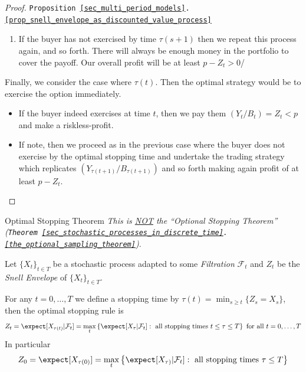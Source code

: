 \documentclass[11pt,a4paper]{article}
\begin{document}
\begin{proof}{\texttt{Proposition \ref{sec_multi_period_models}.\ref{prop_snell_envelope_as_discounted_value_process}}}
\begin{enumerate}
\begin{itemize}
        \item We repeat the process, undertaking the trading strategy that replicates $Y_{\tau(s+1)}/B_{\tau(s+1)}$.
        \item The value of the portfolio to be built up is equal to
        \[ \expect_\Q[Y_{\tau(s+1)}/B_{\tau(s+1)}|\mathcal{F}_s]\leq\expect_\Q[Y_{\tau(s)}/B_{\tau(s)}|\mathcal{F}_s]=Z_s \]
        Therefore the change of the portfolio will only pay us some money which we put in the bank account.
        \item As before, if the option buyer exercises at some time $u\leq\tau(s+1)$ then the value of the portfolio will be enough to cover the payoff $Y_u$.
      \end{itemize}
      \item If the buyer has not exercised by time $\tau(s+1)$ then we repeat this process again, and so forth. There will always be enough money in the portfolio to cover the payoff. Our overall profit will be at least $p-Z_t>0$/
    \end{enumerate}
    Finally, we consider the case where $\tau(t)$. Then the optimal strategy would be to exercise the option immediately.
    \begin{itemize}
      \item If the buyer indeed exercises at time $t$, then we pay them $(Y_t/B_t)=Z_t<p$ and make a riskless-profit.
      \item If note, then we proceed as in the previous case where the buyer does not exercise by the optimal stopping time and undertake the trading strategy which replicates $(Y_{\tau(t+1)}/B_{\tau(t+1)})$ and so forth making again profit of at least $p-Z_t$.
    \end{itemize}
    \proved
  \end{proof}

  \begin{theorem}{Optimal Stopping Theorem}\label{the_optimal_stopping_theorem}
    \textit{This is \underline{NOT} the ``Optional Stopping Theorem'' (\texttt{Theorem \ref{sec_stochastic_processes_in_discrete_time}.\ref{the_optional_sampling_theorem}})}.
    \par Let $\{X_t\}_{t\in T}$ be a stochastic process adapted to some \textit{Filtration} $\mathcal{F}_t$ and $Z_t$ be the \textit{Snell Envelope} of $\{X_t\}_{t\in T}$.
    \par For any $t=0,\dots,T$ we define a stopping time by $\tau(t)=\min_{s\geq t}\{Z_s=X_s\}$, then the optimal stopping rule is
    \begin{equation}\label{eq_optimal_stopping_rule}
      Z_t=\expect[X_{\tau(t)}|\mathcal{F}_t]=\max_t\left\{\expect[X_{\tau}|\mathcal{F}_t]:\text{ all stopping times }t\leq\tau\leq T\right\}\text{ for all }t=0,\dots,T
    \end{equation}
    In particular
    \[ Z_0=\expect[X_{\tau(0)}]=\max_t\left\{\expect[X_{\tau)}|\mathcal{F}_t]:\text{ all stopping times }\tau\leq T\right\} \]
  \end{theorem}
\end{document}
